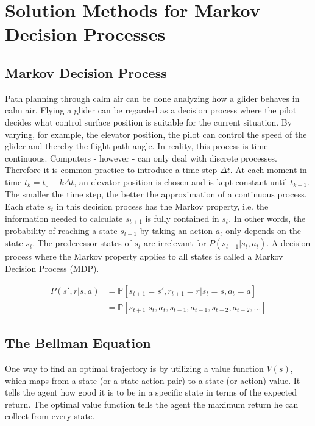 \chapter{Solution Methods for Markov Decision Processes}
\label{chapter2}

\section{Markov Decision Process}

Path planning through calm air can be done analyzing how a glider behaves in calm air. Flying a glider can be regarded as a decision process where the pilot decides what control surface position is suitable for the current situation. By varying, for example, the elevator position, the pilot can control the speed of the glider and thereby the flight path angle. In reality, this process is time-continuous. Computers - however - can only deal with discrete processes. Therefore it is common practice to introduce a time step $\Delta t$. At each moment in time $t_k = t_0 + k\Delta t$, an elevator position is chosen and is kept constant until $t_{k+1}$. The smaller the time step, the better the approximation of a continuous process. Each state $s_t$ in this decision process has the Markov property, i.e. the information needed to calculate $s_{t+1}$ is fully contained in $s_t$. In other words, the probability of reaching a state $s_{t+1}$ by taking an action $a_t$ only depends on the state $s_t$. The predecessor states of $s_t$ are irrelevant for $P(s_{t+1}|s_t,a_t)$. A decision process where the Markov property applies to all states is called a Markov Decision Process (MDP). 

\begin{align}
P(s',r|s,a)&=\mathbb{P}[s_{t+1}=s',r_{t+1}=r|s_t=s,a_t=a] \\
&= \mathbb{P}[s_{t+1}|s_t,a_t,s_{t-1},a_{t-1},s_{t-2},a_{t-2},...]
\end{align}

\section{The Bellman Equation}

One way to find an optimal trajectory is by utilizing a value function $V(s)$, which maps from a state (or a state-action pair) to a state (or action) value. It tells the agent how good it is to be in a specific state in terms of the expected return. The optimal value function tells the agent the maximum return he can collect from every state.

